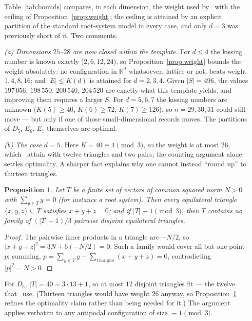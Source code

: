 \documentclass[11pt,reqno]{amsart}
\theoremstyle{plain}
\newtheorem{proposition}[theorem]{Proposition}
\theoremstyle{remark}
\newcommand{\R}{\mathbb{R}}
\begin{document}
Table~\ref{tab:bounds} compares, in each dimension, the weight used
by~\cite{Ma2025} with the ceiling of Proposition~\ref{prop:weight}; the ceiling is
attained by an explicit partition of the standard root-system model in every case,
and only $d = 3$ was previously short of it.  Two comments.

\smallskip\noindent
\emph{(a) Dimensions $25$--$28$ are now closed within the template.}  For
$d \le 4$ the kissing number is known exactly ($2, 6, 12, 24$), so
Proposition~\ref{prop:weight} bounds the weight absolutely: no configuration in
$\R^{d}$ whatsoever, lattice or not, beats weight $1, 4, 8, 16$; and
$|E| \le K(d)$ is attained for $d = 2,3,4$.  Given $|S| = 496$, the values
$197\,056$, $198\,550$, $200\,540$, $204\,520$ are exactly what this template
yields, and improving them requires a larger $S$.  For $d = 5,6,7$ the kissing
numbers are unknown ($K(5) \ge 40$, $K(6) \ge 72$, $K(7) \ge 126$), so
$n = 29,30,31$ could still move --- but only if one of those small-dimensional
records moves.  The partitions of $D_{5}$, $E_{6}$, $E_{7}$ themselves are optimal.

\smallskip\noindent
\emph{(b) The case $d = 5$.}  Here $K = 40 \equiv 1 \pmod 3$, so the weight is at
most $26$, which~\cite{Ma2025} attain with twelve triangles and two pairs; the
counting argument alone settles optimality.  A sharper fact explains why one
cannot instead ``round up'' to thirteen triangles.

\begin{proposition}\label{prop:zerosum}
Let $T$ be a finite set of vectors of common squared norm $N > 0$ with
$\sum_{y \in T} y = 0$ (for instance a root system).  Then every equilateral
triangle $\{x,y,z\} \subseteq T$ satisfies $x+y+z = 0$; and if
$|T| \equiv 1 \pmod 3$, then $T$ contains no family of $(|T|-1)/3$ pairwise
disjoint equilateral triangles.
\end{proposition}

\begin{proof}
The pairwise inner products in a triangle are $-N/2$, so
$|x+y+z|^{2} = 3N + 6(-N/2) = 0$.  Such a family would cover all but one point
$p$; summing, $p = \sum_{y \in T} y - \sum_{\text{triangles}}(x+y+z) = 0$,
contradicting $|p|^{2} = N > 0$.
\end{proof}

For $D_{5}$, $|T| = 40 = 3\cdot13+1$, so at most $12$ disjoint triangles fit ---
the twelve that~\cite{Ma2025} use.  (Thirteen triangles would have weight
$26$ anyway, so Proposition~\ref{prop:zerosum} refines the optimality claim rather
than being needed for it.)  The argument applies verbatim to any antipodal
configuration of size $\equiv 1 \pmod 3$.
\end{document}

